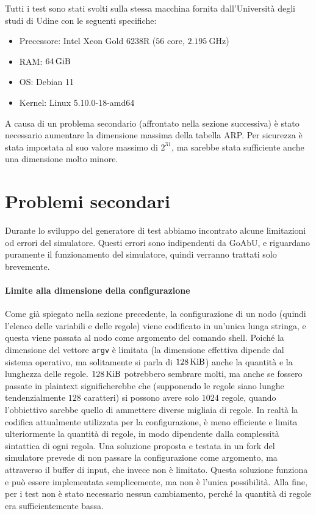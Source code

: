 \documentclass[target=bach]{thud}
\begin{document}
Tutti i test sono stati svolti sulla stessa macchina fornita dall'Università degli studi di Udine con le seguenti specifiche:

\begin{itemize}
    \item Precessore: Intel Xeon Gold 6238R ($56$ core, $\qty{2.195}{\giga\hertz}$)
    \item RAM: $\qty{64}{\gibi\byte}$
    \item OS: Debian 11
    \item Kernel: Linux 5.10.0-18-amd64
\end{itemize}

A causa di un problema secondario (affrontato nella sezione successiva) è stato necessario aumentare la dimensione massima della tabella ARP. Per sicurezza è stata impostata al suo valore massimo di $2^{31}$, ma sarebbe stata sufficiente anche una dimensione molto minore.

\section{Problemi secondari}

Durante lo sviluppo del generatore di test abbiamo incontrato alcune limitazioni od errori del simulatore. Questi errori sono indipendenti da GoAbU, e riguardano puramente il funzionamento del simulatore, quindi verranno trattati solo brevemente.

\paragraph{Limite alla dimensione della configurazione}

Come già spiegato nella sezione precedente, la configurazione di un nodo (quindi l'elenco delle variabili e delle regole) viene codificato in un'unica lunga stringa, e questa viene passata al nodo come argomento del comando shell. Poiché la dimensione del vettore \lstinline{argv} è limitata (la dimensione effettiva dipende dal sistema operativo, ma solitamente si parla di \ensuremath{\qty{128}{\kibi\byte}}) anche la quantità e la lunghezza delle regole.
\ensuremath{\qty{128}{\kibi\byte}} potrebbero sembrare molti, ma anche se fossero passate in plaintext significherebbe che (supponendo le regole siano lunghe tendenzialmente $128$ caratteri) si possono avere solo $1024$ regole, quando l'obbiettivo sarebbe quello di ammettere diverse migliaia di regole. In realtà la codifica attualmente utilizzata per la configurazione, è meno efficiente e limita ulteriormente la quantità di regole, in modo dipendente dalla complessità sintattica di ogni regola.
Una soluzione proposta e testata in un fork del simulatore prevede di non passare la configurazione come argomento, ma attraverso il buffer di input, che invece non è limitato. Questa soluzione funziona e può essere implementata semplicemente, ma non è l'unica possibilità.
Alla fine, per i test non è stato necessario nessun cambiamento, perché la quantità di regole era sufficientemente bassa.
\end{document}
